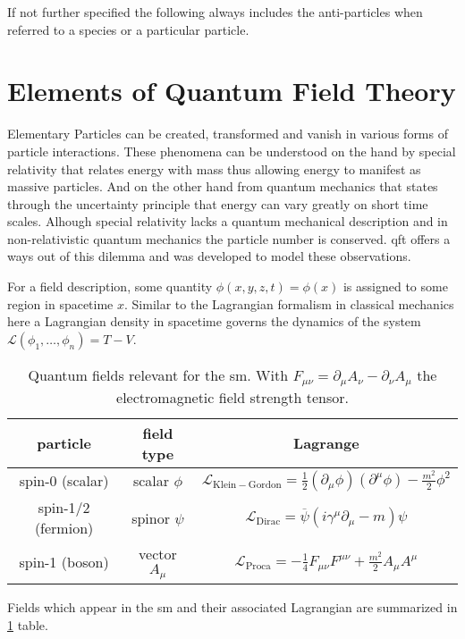 If not further specified the following always includes the anti-particles when referred to a species or a particular particle.

\section{Elements of Quantum Field Theory}\label{sec:qft}
Elementary Particles can be created, transformed and vanish in various forms of particle interactions. These phenomena can be understood on the hand by special relativity that relates energy with mass thus allowing energy to manifest as massive particles. And on the other hand from quantum mechanics that states through the uncertainty principle that energy can vary greatly on short time scales. Alhough special relativity lacks a quantum mechanical description and in non-relativistic quantum mechanics the particle number is conserved. \ac{qft} offers a ways out of this dilemma and was developed to model these observations.

For a field description, some quantity $\phi(x,y,z,t)=\phi(x)$ is assigned to some region in spacetime $x$. Similar to the Lagrangian formalism in classical mechanics here a Lagrangian density in spacetime governs the dynamics of the system $\mathcal{L}(\phi_1,\dots,\phi_n) =T-V$.
\begin{table}
    \begin{center}
        \begin{tabular}{c|c|c}
            particle           & field type      & Lagrange                                                                                                     \\ [1ex]  \hline
            spin-0 (scalar)    & scalar $\phi$   & $\mathcal{L}_\mathrm{Klein-Gordon}=\frac{1}{2} (\partial_\mu \phi )(\partial^\mu \phi)-\frac{m^2}{2}\phi^2 $ \\  [1.5ex]
            spin-1/2 (fermion) & spinor $\psi$   & $\mathcal{L}_\mathrm{Dirac}= \overline{\psi}(i \gamma^\mu \partial_\mu - m )\psi$                            \\  [1.5ex]
            spin-1 (boson)     & vector  $A_\mu$ & $\mathcal{L}_\mathrm{Proca}= -\frac{1}{4}F_{\mu\nu}F^{\mu\nu} +\frac{m^2}{2} A_\mu A^\mu$                    \\  [2ex]
        \end{tabular}
        \caption{Quantum fields relevant for the \ac{sm}. With $F_{\mu\nu}=\partial_\mu A_\nu - \partial_\nu A_\mu$ the electromagnetic field strength tensor.}
        \label{tab:fields}
    \end{center}
\end{table}
Fields which appear in the \ac{sm} and their associated Lagrangian are summarized in \ref{tab:fields} table.

